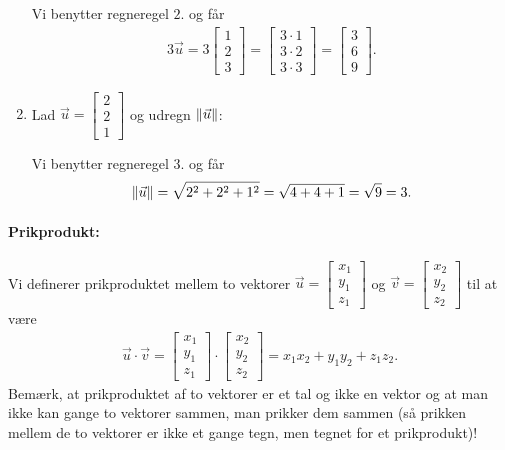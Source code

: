 \begin{enumerate}
Vi benytter regneregel $2$. og får
\begin{align*}
3\vec{u} = 3\begin{bmatrix} 1 \\ 2 \\ 3 \end{bmatrix} = \begin{bmatrix} 3\cdot 1 \\ 3 \cdot 2 \\ 3 \cdot 3 \end{bmatrix}  = \begin{bmatrix} 3 \\ 6 \\ 9 \end{bmatrix}. 
\end{align*}
\item Lad $\vec{u}= \begin{bmatrix} 2 \\ 2 \\ 1 \end{bmatrix}$ og udregn $\Vert \vec{u}\Vert$:

Vi benytter regneregel $3.$ og får
\begin{align*}
\Vert \vec{u}\Vert = \sqrt{2^2+2^2 + 1^2} = \sqrt{4+4+1}= \sqrt{9}=3.
\end{align*}
\end{enumerate}

\paragraph*{Prikprodukt:}
Vi definerer prikproduktet mellem to vektorer $\vec{u} = \begin{bmatrix} x_1 \\ y_1 \\ z_1 \end{bmatrix}$ og $\vec{v} = \begin{bmatrix} x_2 \\ y_2 \\ z_2 \end{bmatrix}$ til at være
\begin{align}\label{eq:vec3d1prikprodukt}
\vec{u} \cdot \vec{v} =\begin{bmatrix} x_1 \\ y_1 \\ z_1 \end{bmatrix} \cdot \begin{bmatrix} x_2 \\ y_2 \\ z_2 \end{bmatrix} = x_1 x_2 + y_1  y_2 + z_1z_2.
\end{align}
Bemærk, at prikproduktet af to vektorer er et tal og ikke en vektor og at man ikke kan gange to vektorer sammen, man prikker dem sammen (så prikken mellem de to vektorer er ikke et gange tegn, men tegnet for et prikprodukt)!

